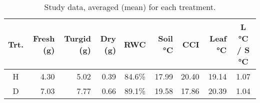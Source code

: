 \documentclass{report}
\begin{document}
\vspace{1cm}

\begin{table}[h]
    \caption{Study data, averaged (mean) for each treatment.}
    \begin{tabular}{c||r|r|r|c|r|r|r|c}
    \textbf{Trt.} & \textbf{Fresh (g)} & \textbf{Turgid (g)} & \textbf{Dry (g)} & \textbf{RWC} & \textbf{Soil °C} & \textbf{CCI} & \textbf{Leaf °C} & \textbf{L °C / S °C} \\ \hline
    H             & 4.30               & 5.02                & 0.39             & 84.6\%       & 17.99            & 20.40        & 19.14            & 1.07                 \\ \hline
    D             & 7.03               & 7.77                & 0.66             & 89.1\%       & 19.58            & 17.86        & 20.39            & 1.04                 \\ 
    \end{tabular}
\end{table}

\clearpage


\pgfplotsset{width=0.9\textwidth,compat=1.9}
\end{document}
